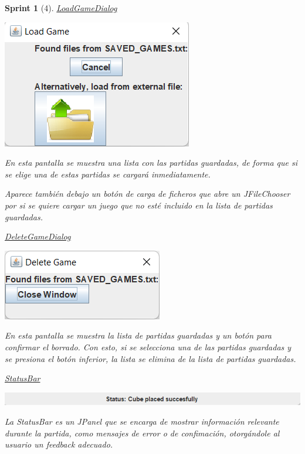 \documentclass{article}
\theoremstyle{break}
\newtheorem*{sprint}{Sprint}
\begin{document}
\begin{sprint}[4]
\underline{LoadGameDialog}
\begin{center}
\includegraphics[scale=0.8]{load-dialog-sprint3.png}
\end{center}

En esta pantalla se muestra una lista con las partidas guardadas, de forma que si se elige una de estas partidas se cargará inmediatamente.

Aparece también debajo un botón de carga de ficheros que abre un  \textit{JFileChooser} por si se quiere cargar un juego que no esté incluido en la lista de partidas guardadas.

\underline{DeleteGameDialog}
\begin{center}
\includegraphics[scale=0.8]{delete-dialog-sprint3.png}
\end{center}

En esta pantalla se muestra la lista de partidas guardadas y un botón para confirmar el borrado. Con esto, si se selecciona una de las partidas guardadas y se presiona el botón inferior, la lista se elimina de la lista de partidas guardadas.

\underline{StatusBar}
\begin{center}
\includegraphics[scale=0.8]{status-bar-sprint3.png}
\end{center}

La \textit{StatusBar} es un \textit{JPanel} que se encarga de mostrar información relevante durante la partida, como mensajes de error o de confimación, otorgándole al usuario un feedback adecuado.


\end{sprint}
\end{document}
